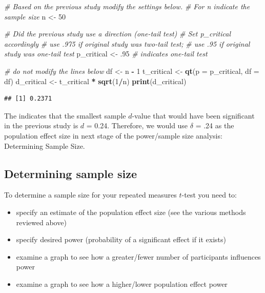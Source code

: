 \documentclass[
]{krantz}
\makeatletter
\newenvironment{Shaded}{\begin{snugshade}}{\end{snugshade}}
\newcommand{\CommentTok}[1]{\textcolor[rgb]{0.37,0.37,0.37}{\textit{#1}}}
\newcommand{\DataTypeTok}[1]{\textcolor[rgb]{0.27,0.27,0.27}{#1}}
\newcommand{\DecValTok}[1]{\textcolor[rgb]{0.06,0.06,0.06}{#1}}
\newcommand{\FloatTok}[1]{\textcolor[rgb]{0.06,0.06,0.06}{#1}}
\newcommand{\KeywordTok}[1]{\textcolor[rgb]{0.27,0.27,0.27}{\textbf{#1}}}
\newcommand{\NormalTok}[1]{#1}
\newcommand{\OperatorTok}[1]{\textcolor[rgb]{0.43,0.43,0.43}{\textbf{#1}}}
\newcommand{\StringTok}[1]{\textcolor[rgb]{0.5,0.5,0.5}{#1}}
\newenvironment{kframe}{%
\medskip{}
\setlength{\fboxsep}{.8em}
 \def\at@end@of@kframe{}%
 \ifinner\ifhmode%
  \def\at@end@of@kframe{\end{minipage}}%
  \begin{minipage}{\columnwidth}%
 \fi\fi%
 \def\FrameCommand##1{\hskip\@totalleftmargin \hskip-\fboxsep
 \colorbox{shadecolor}{##1}\hskip-\fboxsep
     \hskip-\linewidth \hskip-\@totalleftmargin \hskip\columnwidth}%
 \MakeFramed {\advance\hsize-\width
   \@totalleftmargin\z@ \linewidth\hsize
   \@setminipage}}%
 {\par\unskip\endMakeFramed%
 \at@end@of@kframe}
\renewenvironment{Shaded}{\begin{kframe}}{\end{kframe}}
\makeatother
\begin{document}
\begin{Shaded}
\begin{Highlighting}[]
\CommentTok{# Based on the previous study modify the settings below.}
\CommentTok{# For n indicate the sample size}
\NormalTok{n <-}\StringTok{ }\DecValTok{50}

\CommentTok{# Did the previous study use a direction (one-tail test)}
\CommentTok{# Set p_critical accordingly}
\CommentTok{# use .975 if original study was two-tail test;}
\CommentTok{# use .95 if original study was one-tail test}
\NormalTok{p_critical <-}\StringTok{ }\FloatTok{.95} \CommentTok{# indicates one-tail test}

\CommentTok{# do not modify the lines below}
\NormalTok{df <-}\StringTok{ }\NormalTok{n }\OperatorTok{-}\StringTok{ }\DecValTok{1}
\NormalTok{t_critical <-}\StringTok{ }\KeywordTok{qt}\NormalTok{(}\DataTypeTok{p =}\NormalTok{ p_critical, }\DataTypeTok{df =}\NormalTok{ df) }
\NormalTok{d_critical <-}\StringTok{ }\NormalTok{t_critical }\OperatorTok{*}\StringTok{ }\KeywordTok{sqrt}\NormalTok{(}\DecValTok{1}\OperatorTok{/}\NormalTok{n)}
\KeywordTok{print}\NormalTok{(d_critical)}
\end{Highlighting}
\end{Shaded}

\begin{verbatim}
## [1] 0.2371
\end{verbatim}

The indicates that the smallest sample \(d\)-value that would have been significant in the previous study is \(d\) = 0.24. Therefore, we would use \(\delta\) = .24 as the population effect size in next stage of the power/sample size analysis: Determining Sample Size.

\hypertarget{determining-sample-size-1}{%
\subsection{Determining sample size}\label{determining-sample-size-1}}

To determine a sample size for your repeated measures \(t\)-test you need to:

\begin{itemize}
\item
  specify an estimate of the population effect size (see the various methods reviewed above)
\item
  specify desired power (probability of a significant effect if it exists)
\item
  examine a graph to see how a greater/fewer number of participants influences power
\item
  examine a graph to see how a higher/lower population effect power
\end{itemize}
\end{document}
